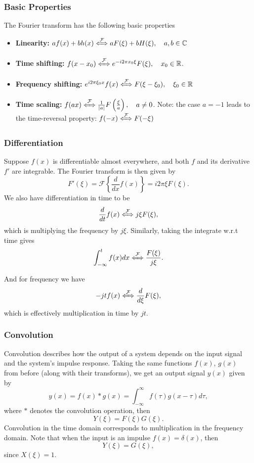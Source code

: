 \documentclass{article}
\begin{document}
\subsubsection{Basic Properties}
The Fourier transform has the following basic properties
\begin{itemize}
    \item \textbf{Linearity:} $af(x)+bh(x) \xLeftrightarrow{\mathcal{F}}aF(\xi )+b H(\xi),\quad a,b \in \mathbb{C}$
    \item \textbf{Time shifting:} $f(x-x_0) \xLeftrightarrow{\mathcal{F}} e^{-i 2\pi x_0\xi }F(\xi ),\quad x _0\in \mathbb{R}$.
    \item \textbf{Frequency shifting:} $e^{i2\pi \xi _0x}f(x) \xLeftrightarrow{\mathcal{F}}F(\xi -\xi _0),\quad \xi _0\in \mathbb{R}$
    \item \textbf{Time scaling:} $f(ax) \xLeftrightarrow{\mathcal{F}}\frac{1}{|a|}F \left( \frac{\xi }{a} \right),\quad a\neq 0$. Note: the case $a=-1$ leads to the time-reversal property: $f(-x) \xLeftrightarrow{\mathcal{F}}F(-\xi )$
\end{itemize}

\subsubsection{Differentiation}
Suppose $f(x)$ is differentiable almost everywhere, and both $f$ and its derivative $f'$ are integrable. The Fourier transform is then given by
\[
    F'(\xi )=\mathcal{F}\left\{ \frac{d }{d x}f(x) \right\}=i 2\pi \xi F(\xi ).
\]
We also have differentiation in time to be
\[
    \frac{d }{d t}f(x) \xLeftrightarrow{\mathcal{F}} j\xi F(\xi ),
\]
which is multiplying the frequency by $j\xi $. Similarly, taking the integrate w.r.t time gives
\[
    \int_{-\infty}^tf(x)dx \xLeftrightarrow{\mathcal{F}}\frac{F(\xi )}{j\xi }.
\]

And for frequency we have
\[
    -jtf(x) \xLeftrightarrow{\mathcal{F}}\frac{d }{d \xi }F(\xi ),
\]
which is effectively multiplication in time by $jt$.

\subsubsection{Convolution}
Convolution describes how the output of a system depends on the input signal and the system's impulse response. Taking the same functions $f(x)$, $g(x)$ from before (along with their transforms), we get an output signal $y(x)$ given by
\[
    y(x)=f(x)*g(x)=\int_{-\infty}^\infty f(\tau )g(x-\tau )d\tau ,
\]
where $*$ denotes the convolution operation, then
\[
    Y(\xi )=F(\xi )G(\xi ).
\]
Convolution in the time domain corresponds to multiplication in the frequency domain. Note that when the input is an impulse $f(x)=\delta (x)$, then
\[
    Y(\xi )=G(\xi ),
\]
since $X(\xi )=1$.
\end{document}

